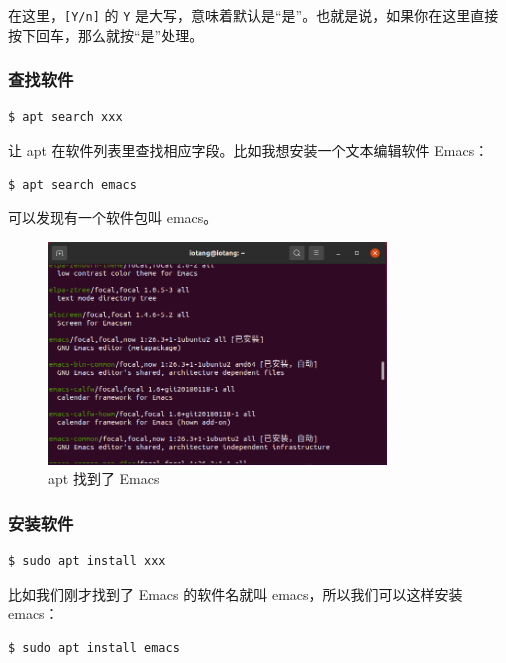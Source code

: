 \documentclass[UTF-8]{ctexart}
\begin{document}
				在这里，\texttt{[Y/n]} 的 \texttt{Y} 是大写，意味着默认是“是”。也就是说，如果你在这里直接按下回车，那么就按“是”处理。
				
			\subsubsection{查找软件}
				
				\begin{verbatim}
$ apt search xxx
				\end{verbatim}
			
				让 apt 在软件列表里查找相应字段。比如我想安装一个文本编辑软件 Emacs：
				
				\begin{verbatim}
$ apt search emacs
				\end{verbatim}
			
				可以发现有一个软件包叫 emacs。
				
				\begin{figure}[H]
					\centering
					\includegraphics[width=0.8\textwidth]{fig/apt_find_emacs.png}
					\caption*{apt 找到了 Emacs}
				\end{figure}

			\subsubsection{安装软件}
		
				\begin{verbatim}
$ sudo apt install xxx
				\end{verbatim}
				
				比如我们刚才找到了 Emacs 的软件名就叫 emacs，所以我们可以这样安装 emacs：
				
				\begin{verbatim}
$ sudo apt install emacs
				\end{verbatim}
			
\end{document}
